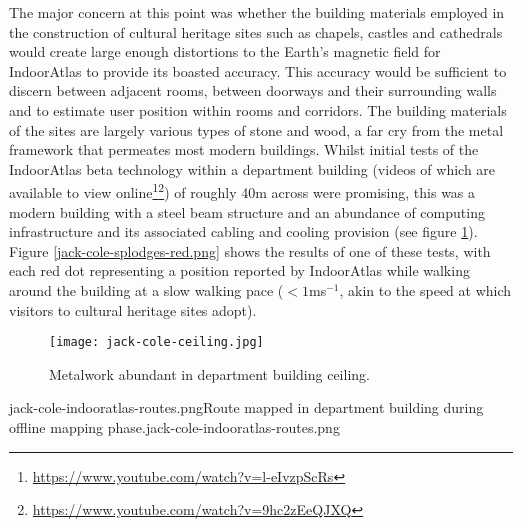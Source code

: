 The major concern at this point was whether the building materials employed in the construction of cultural heritage sites such as chapels, castles and cathedrals would create large enough distortions to the Earth's magnetic field for IndoorAtlas to provide its boasted accuracy. This accuracy would be sufficient to discern between adjacent rooms, between doorways and their surrounding walls and to estimate user position within rooms and corridors. The building materials of the sites are largely various types of stone and wood, a far cry from the metal framework that permeates most modern buildings. Whilst initial tests of the IndoorAtlas beta technology within a department building (videos of which are available to view online\footnote{\url{https://www.youtube.com/watch?v=l-eIvzpScRs}}\footnote{\url{https://www.youtube.com/watch?v=9hc2zEeQJXQ}}) of roughly 40m across were promising, this was a modern building with a steel beam structure and an abundance of computing infrastructure and its associated cabling and cooling provision (see figure \ref{jack-cole-ceiling.jpg}). Figure \ref{jack-cole-splodges-red.png} shows the results of one of these tests, with each red dot representing a position reported by IndoorAtlas while walking around the building at a slow walking pace ($<1$ms$^{-1}$, akin to the speed at which visitors to cultural heritage sites adopt).

\begin{figure}[h]
	\begin{center}
		\texttt{[image: jack-cole-ceiling.jpg]}
		\caption{Metalwork abundant in department building ceiling.}
		\label{jack-cole-ceiling.jpg}
	\end{center}
\end{figure}

       {jack-cole-indooratlas-routes.png}{Route mapped in department building during offline mapping phase.}{jack-cole-indooratlas-routes.png}

